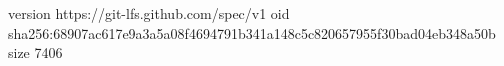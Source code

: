 version https://git-lfs.github.com/spec/v1
oid sha256:68907ac617e9a3a5a08f4694791b341a148c5c820657955f30bad04eb348a50b
size 7406

